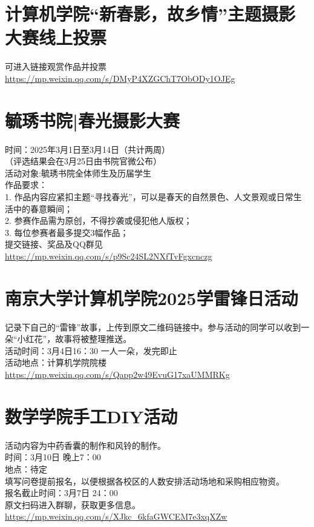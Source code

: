 \documentclass[letterpaper, 12pt]{article}
\begin{document}
\begin{multicols}{2}
\section{计算机学院“新春影，故乡情”主题摄影大赛线上投票}
可进入链接观赏作品并投票\url{https://mp.weixin.qq.com/s/DMyP4XZGChT7ObODy1OJEg}


\section{毓琇书院|春光摄影大赛}
时间：2025年3月1日至3月14日（共计两周）\\
（评选结果会在3月25日由书院官微公布）\\
活动对象:毓琇书院全体师生及历届学生\\
作品要求：\\
1. 作品内容应紧扣主题“寻找春光”，可以是春天的自然景色、人文景观或日常生活中的春意瞬间；\\
2. 参赛作品需为原创，不得抄袭或侵犯他人版权；\\
3. 每位参赛者最多提交3幅作品；\\
提交链接、奖品及QQ群见\url{https://mp.weixin.qq.com/s/p9Sc24SL2NXfTvFgxcnczg}








\section{南京大学计算机学院2025学雷锋日活动}
记录下自己的“雷锋”故事，上传到原文二维码链接中。参与活动的同学可以收到一朵“小红花”，故事将被整理推送。\\
活动时间：3月4日16：30 一人一朵，发完即止\\
活动地点：计算机学院院楼\\
\url{https://mp.weixin.qq.com/s/Qapp2w49EvuG17xaUMMRKg}\\

\section{数学学院手工DIY活动}
活动内容为中药香囊的制作和风铃的制作。\\
时间：3月10日 晚上7：00\\
地点：待定\\
填写问卷提前报名，以便根据各校区的人数安排活动场地和采购相应物资。\\
报名截止时间：3月7日 24：00\\
原文扫码进入群聊，获取更多信息。\\
\url{https://mp.weixin.qq.com/s/XJkc_6kfaGWCEM7e3xqXZw}\\








\end{multicols}
\end{document}
